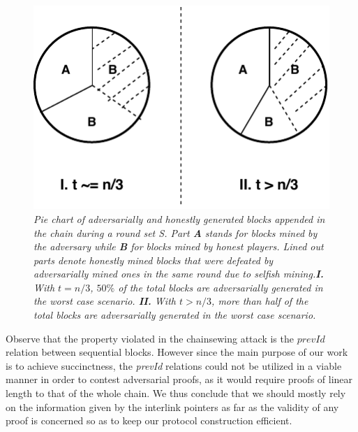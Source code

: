 \begin{figure}[h!]
	\begin{center}
		\includegraphics[scale=0.8]{figures/selfish_mining_pie.pdf}
	\end{center}
	\caption{\textit{Pie chart of adversarially and honestly generated blocks appended in 
	the chain during a round set S. Part \textbf{A} stands for blocks mined by the
	adversary while \textbf{B} for blocks mined by honest players. Lined out parts
	denote honestly mined blocks that were defeated by adversarially mined ones in
	the same round due to selfish mining.\textbf{I.} With $t = n/3$, $50\%$ of the
	total blocks are adversarially generated in the worst case scenario. \textbf{II.}
	With $t > n/3$, more than half of the total blocks are adversarially generated in
	the worst case scenario.}}
	\label{fig:selfish_mining_pie}
\end{figure}

Observe that the property violated in the chainsewing attack is the $prevId$ relation
between sequential blocks. However since the main purpose of our work is to achieve
succinctness, the \textit{prevId} relations could not be utilized in a viable manner
in order to contest adversarial proofs, as it would require proofs of linear length
to that of the whole chain.  We thus conclude that we should mostly rely on the
information given by the interlink pointers as far as the validity of any proof
is concerned so as to keep our protocol construction efficient.

